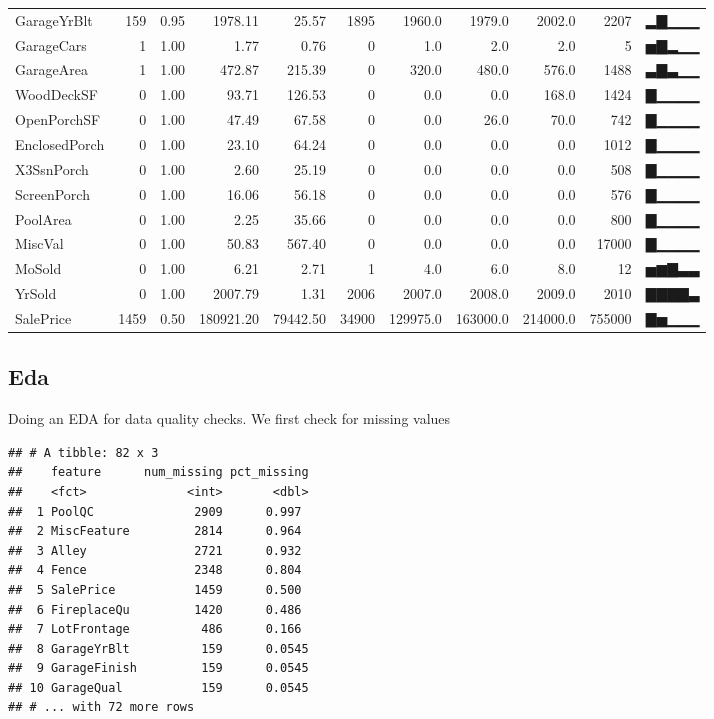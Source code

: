 \documentclass[
]{article}
\newenvironment{Shaded}{\begin{snugshade}}{\end{snugshade}}
\newcommand{\KeywordTok}[1]{\textcolor[rgb]{0.13,0.29,0.53}{\textbf{#1}}}
\newcommand{\NormalTok}[1]{#1}
\newcommand{\OperatorTok}[1]{\textcolor[rgb]{0.81,0.36,0.00}{\textbf{#1}}}
\newcommand{\StringTok}[1]{\textcolor[rgb]{0.31,0.60,0.02}{#1}}
\begin{document}
\begin{longtable}[]{@{}lrrrrrrrrrl@{}}
GarageYrBlt & 159 & 0.95 & 1978.11 & 25.57 & 1895 & 1960.0 & 1979.0 &
2002.0 & 2207 & ▂▇▁▁▁\tabularnewline
GarageCars & 1 & 1.00 & 1.77 & 0.76 & 0 & 1.0 & 2.0 & 2.0 & 5 &
▅▇▂▁▁\tabularnewline
GarageArea & 1 & 1.00 & 472.87 & 215.39 & 0 & 320.0 & 480.0 & 576.0 &
1488 & ▃▇▃▁▁\tabularnewline
WoodDeckSF & 0 & 1.00 & 93.71 & 126.53 & 0 & 0.0 & 0.0 & 168.0 & 1424 &
▇▁▁▁▁\tabularnewline
OpenPorchSF & 0 & 1.00 & 47.49 & 67.58 & 0 & 0.0 & 26.0 & 70.0 & 742 &
▇▁▁▁▁\tabularnewline
EnclosedPorch & 0 & 1.00 & 23.10 & 64.24 & 0 & 0.0 & 0.0 & 0.0 & 1012 &
▇▁▁▁▁\tabularnewline
X3SsnPorch & 0 & 1.00 & 2.60 & 25.19 & 0 & 0.0 & 0.0 & 0.0 & 508 &
▇▁▁▁▁\tabularnewline
ScreenPorch & 0 & 1.00 & 16.06 & 56.18 & 0 & 0.0 & 0.0 & 0.0 & 576 &
▇▁▁▁▁\tabularnewline
PoolArea & 0 & 1.00 & 2.25 & 35.66 & 0 & 0.0 & 0.0 & 0.0 & 800 &
▇▁▁▁▁\tabularnewline
MiscVal & 0 & 1.00 & 50.83 & 567.40 & 0 & 0.0 & 0.0 & 0.0 & 17000 &
▇▁▁▁▁\tabularnewline
MoSold & 0 & 1.00 & 6.21 & 2.71 & 1 & 4.0 & 6.0 & 8.0 & 12 &
▅▆▇▃▃\tabularnewline
YrSold & 0 & 1.00 & 2007.79 & 1.31 & 2006 & 2007.0 & 2008.0 & 2009.0 &
2010 & ▇▇▇▇▃\tabularnewline
SalePrice & 1459 & 0.50 & 180921.20 & 79442.50 & 34900 & 129975.0 &
163000.0 & 214000.0 & 755000 & ▇▅▁▁▁\tabularnewline
\bottomrule
\end{longtable}

\hypertarget{eda}{%
\subsection{Eda}\label{eda}}

Doing an EDA for data quality checks. We first check for missing values

\begin{Shaded}
\end{Shaded}

\begin{verbatim}
## # A tibble: 82 x 3
##    feature      num_missing pct_missing
##    <fct>              <int>       <dbl>
##  1 PoolQC              2909      0.997 
##  2 MiscFeature         2814      0.964 
##  3 Alley               2721      0.932 
##  4 Fence               2348      0.804 
##  5 SalePrice           1459      0.500 
##  6 FireplaceQu         1420      0.486 
##  7 LotFrontage          486      0.166 
##  8 GarageYrBlt          159      0.0545
##  9 GarageFinish         159      0.0545
## 10 GarageQual           159      0.0545
## # ... with 72 more rows
\end{verbatim}
\end{document}
